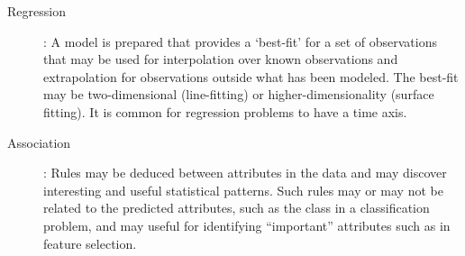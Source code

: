 \begin{description}
	\item[Regression]: A model is prepared that provides a `best-fit' for a set of observations that may be used for interpolation over known observations and extrapolation for observations outside what has been modeled. The best-fit may be two-dimensional (line-fitting) or higher-dimensionality (surface fitting). It is common for regression problems to have a time axis.
	
	\item[Association]: Rules may be deduced between attributes in the data and may discover interesting and useful statistical patterns. Such rules may or may not be related to the predicted attributes, such as the class in a classification problem, and may useful for identifying ``important'' attributes such as in feature selection.
		
\end{description}
